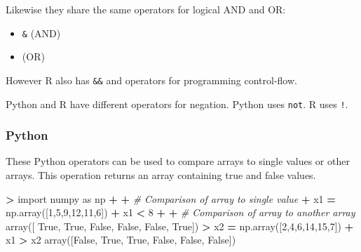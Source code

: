 \documentclass[
]{book}
\newenvironment{Shaded}{\begin{snugshade}}{\end{snugshade}}
\newcommand{\CommentTok}[1]{\textcolor[rgb]{0.56,0.35,0.01}{\textit{#1}}}
\newcommand{\DecValTok}[1]{\textcolor[rgb]{0.00,0.00,0.81}{#1}}
\newcommand{\ImportTok}[1]{#1}
\newcommand{\NormalTok}[1]{#1}
\newcommand{\OperatorTok}[1]{\textcolor[rgb]{0.81,0.36,0.00}{\textbf{#1}}}
\newcommand{\VariableTok}[1]{\textcolor[rgb]{0.00,0.00,0.00}{#1}}
\providecommand{\tightlist}{%
  \setlength{\itemsep}{0pt}\setlength{\parskip}{0pt}}
\begin{document}
Likewise they share the same operators for logical AND and OR:

\begin{itemize}
\tightlist
\item
  \texttt{\&} (AND)
\item
  \texttt{\textbar{}} (OR)
\end{itemize}

However R also has \texttt{\&\&} and \texttt{\textbar{}\textbar{}} operators for programming control-flow.

Python and R have different operators for negation. Python uses \texttt{not}. R uses \texttt{!}.

\hypertarget{python-4}{%
\subsubsection*{Python}\label{python-4}}

These Python operators can be used to compare arrays to single values or other arrays. This operation returns an array containing true and false values.

\begin{Shaded}
\begin{Highlighting}[]
\OperatorTok{\textgreater{}} \ImportTok{import}\NormalTok{ numpy }\ImportTok{as}\NormalTok{ np }
\OperatorTok{+} 
\OperatorTok{+} \CommentTok{\# Comparison of array to single value}
\OperatorTok{+}\NormalTok{ x1 }\OperatorTok{=}\NormalTok{ np.array([}\DecValTok{1}\NormalTok{,}\DecValTok{5}\NormalTok{,}\DecValTok{9}\NormalTok{,}\DecValTok{12}\NormalTok{,}\DecValTok{11}\NormalTok{,}\DecValTok{6}\NormalTok{])}
\OperatorTok{+}\NormalTok{ x1 }\OperatorTok{\textless{}} \DecValTok{8}
\OperatorTok{+} 
\OperatorTok{+} \CommentTok{\# Comparison of array to another array }
\NormalTok{array([ }\VariableTok{True}\NormalTok{,  }\VariableTok{True}\NormalTok{, }\VariableTok{False}\NormalTok{, }\VariableTok{False}\NormalTok{, }\VariableTok{False}\NormalTok{,  }\VariableTok{True}\NormalTok{])}
\OperatorTok{\textgreater{}}\NormalTok{ x2 }\OperatorTok{=}\NormalTok{ np.array([}\DecValTok{2}\NormalTok{,}\DecValTok{4}\NormalTok{,}\DecValTok{6}\NormalTok{,}\DecValTok{14}\NormalTok{,}\DecValTok{15}\NormalTok{,}\DecValTok{7}\NormalTok{])}
\OperatorTok{+}\NormalTok{ x1 }\OperatorTok{\textgreater{}}\NormalTok{ x2}
\NormalTok{array([}\VariableTok{False}\NormalTok{,  }\VariableTok{True}\NormalTok{,  }\VariableTok{True}\NormalTok{, }\VariableTok{False}\NormalTok{, }\VariableTok{False}\NormalTok{, }\VariableTok{False}\NormalTok{])}
\end{Highlighting}
\end{Shaded}
\end{document}
